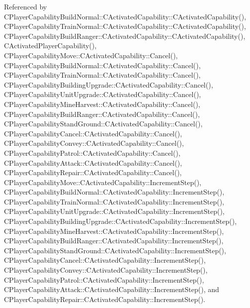 Referenced by C\+Player\+Capability\+Build\+Normal\+::\+C\+Activated\+Capability\+::\+C\+Activated\+Capability(), C\+Player\+Capability\+Train\+Normal\+::\+C\+Activated\+Capability\+::\+C\+Activated\+Capability(), C\+Player\+Capability\+Build\+Ranger\+::\+C\+Activated\+Capability\+::\+C\+Activated\+Capability(), C\+Activated\+Player\+Capability(), C\+Player\+Capability\+Move\+::\+C\+Activated\+Capability\+::\+Cancel(), C\+Player\+Capability\+Build\+Normal\+::\+C\+Activated\+Capability\+::\+Cancel(), C\+Player\+Capability\+Train\+Normal\+::\+C\+Activated\+Capability\+::\+Cancel(), C\+Player\+Capability\+Building\+Upgrade\+::\+C\+Activated\+Capability\+::\+Cancel(), C\+Player\+Capability\+Unit\+Upgrade\+::\+C\+Activated\+Capability\+::\+Cancel(), C\+Player\+Capability\+Mine\+Harvest\+::\+C\+Activated\+Capability\+::\+Cancel(), C\+Player\+Capability\+Build\+Ranger\+::\+C\+Activated\+Capability\+::\+Cancel(), C\+Player\+Capability\+Stand\+Ground\+::\+C\+Activated\+Capability\+::\+Cancel(), C\+Player\+Capability\+Cancel\+::\+C\+Activated\+Capability\+::\+Cancel(), C\+Player\+Capability\+Convey\+::\+C\+Activated\+Capability\+::\+Cancel(), C\+Player\+Capability\+Patrol\+::\+C\+Activated\+Capability\+::\+Cancel(), C\+Player\+Capability\+Attack\+::\+C\+Activated\+Capability\+::\+Cancel(), C\+Player\+Capability\+Repair\+::\+C\+Activated\+Capability\+::\+Cancel(), C\+Player\+Capability\+Move\+::\+C\+Activated\+Capability\+::\+Increment\+Step(), C\+Player\+Capability\+Build\+Normal\+::\+C\+Activated\+Capability\+::\+Increment\+Step(), C\+Player\+Capability\+Train\+Normal\+::\+C\+Activated\+Capability\+::\+Increment\+Step(), C\+Player\+Capability\+Unit\+Upgrade\+::\+C\+Activated\+Capability\+::\+Increment\+Step(), C\+Player\+Capability\+Building\+Upgrade\+::\+C\+Activated\+Capability\+::\+Increment\+Step(), C\+Player\+Capability\+Mine\+Harvest\+::\+C\+Activated\+Capability\+::\+Increment\+Step(), C\+Player\+Capability\+Build\+Ranger\+::\+C\+Activated\+Capability\+::\+Increment\+Step(), C\+Player\+Capability\+Stand\+Ground\+::\+C\+Activated\+Capability\+::\+Increment\+Step(), C\+Player\+Capability\+Cancel\+::\+C\+Activated\+Capability\+::\+Increment\+Step(), C\+Player\+Capability\+Convey\+::\+C\+Activated\+Capability\+::\+Increment\+Step(), C\+Player\+Capability\+Patrol\+::\+C\+Activated\+Capability\+::\+Increment\+Step(), C\+Player\+Capability\+Attack\+::\+C\+Activated\+Capability\+::\+Increment\+Step(), and C\+Player\+Capability\+Repair\+::\+C\+Activated\+Capability\+::\+Increment\+Step().

\hypertarget{classCActivatedPlayerCapability_a9bf27c322a73f4b11c8183cc1973c3d8}{}\label{classCActivatedPlayerCapability_a9bf27c322a73f4b11c8183cc1973c3d8} 
